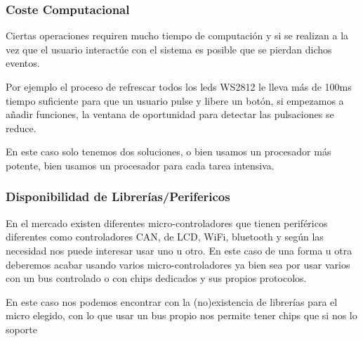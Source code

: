 \subsubsection{Coste Computacional}
Ciertas operaciones requiren mucho tiempo de computación y si se realizan a la vez que el usuario interactúe con
el sistema es posible que se pierdan dichos eventos.

Por ejemplo el proceso de refrescar todos los leds WS2812 le lleva más de 100ms tiempo suficiente para que un
usuario pulse y libere un botón, si empezamos a añadir funciones, la ventana de oportunidad para detectar las
pulsaciones se reduce.

En este caso solo tenemos dos soluciones, o bien usamos un procesador más potente, bien usamos un procesador
para cada tarea intensiva.

\subsubsection{Disponibilidad de Librerías/Perifericos}
En el mercado existen diferentes micro-controladores que tienen periféricos diferentes como controladores CAN,
de LCD, WiFi, bluetooth y según las necesidad nos puede interesar usar uno u otro. En este caso de una forma u
otra deberemos acabar usando varios micro-controladores ya bien sea por usar varios con un bus controlado o con
chips dedicados y sus propios protocolos.

En este caso nos podemos encontrar con la (no)existencia de librerías para el micro elegido, con lo que usar
un bus propio nos permite tener chips que si nos lo soporte 
